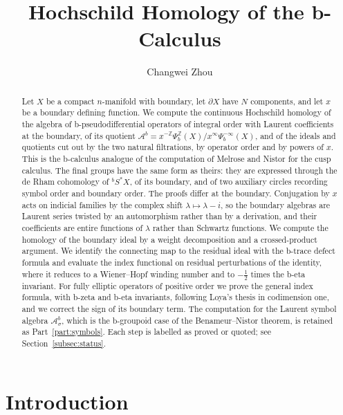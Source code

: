 \documentclass[11pt,oneside,reqno]{article}
\title{Hochschild Homology of the b-Calculus}
\author{Changwei Zhou}
\date{}
\newcommand{\Z}{\mathbb Z}
\newcommand{\Sbstar}{{}^{b}S^*X}
\newcommand{\Ab}{\mathcal A^b}
\newcommand{\Asb}{\mathcal A^b_\sigma}
\theoremstyle{plain}
\theoremstyle{definition}
\theoremstyle{remark}
\begin{document}
\hypersetup{pageanchor=false}
\maketitle
\thispagestyle{empty}
\clearpage
\hypersetup{pageanchor=true}
\tableofcontents
\clearpage
\listoffigures
\clearpage
{}
\setcounter{page}{1}

\begin{abstract}
Let \(X\) be a compact \(n\)-manifold with boundary, let \(\partial X\) have
\(N\) components, and let \(x\) be a boundary defining function. We
compute the continuous Hochschild homology of the algebra of
b-pseudodifferential operators of integral order with Laurent coefficients
at the boundary, of its quotient
\(\Ab=x^{-\Z}\Psi_b^{\Z}(X)/x^\infty\Psi_b^{-\infty}(X)\), and of the
ideals and quotients cut out by the two natural filtrations, by operator
order and by powers of \(x\). This is the b-calculus analogue of the
computation of Melrose and Nistor for the cusp calculus. The final groups
have the same form as theirs: they are expressed through the de Rham
cohomology of \(\Sbstar\), of its boundary, and of two auxiliary circles
recording symbol order and boundary order. The proofs differ at the
boundary. Conjugation by \(x\) acts on indicial families by the complex
shift \(\lambda\mapsto\lambda-i\), so the boundary algebras are Laurent
series twisted by an automorphism rather than by a derivation, and their
coefficients are entire functions of \(\lambda\) rather than Schwartz
functions. We compute the homology of the boundary ideal by a weight
decomposition and a crossed-product argument. We identify the connecting
map to the residual ideal with the b-trace defect formula and evaluate the
index functional on residual perturbations of the identity, where it
reduces to a Wiener--Hopf winding number and to \(-\tfrac12\) times the
b-eta invariant. For fully elliptic operators of positive order we prove
the general index formula, with b-zeta and b-eta invariants, following
Loya's thesis in codimension one, and we correct the sign of its boundary
term. The computation for the Laurent symbol algebra
\(\Asb\), which is the b-groupoid case of the Benameur--Nistor theorem,
is retained as Part~\ref{part:symbols}. Each step is labelled as proved
or quoted; see Section~\ref{subsec:status}.
\end{abstract}

\section{Introduction}\label{sec:intro}
\end{document}
